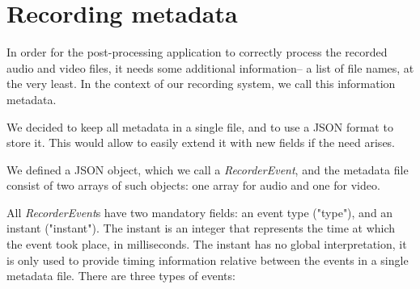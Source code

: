 \documentclass[twoside,openright,a4paper,12pt,english]{article}
\begin{document}
\section{Recording metadata}
\label{recording-metadata}
In order for the post-processing application to correctly process the recorded
audio and video files, it needs some additional information-- a list of file
names, at the very least. In the context of our recording system, we call this information
metadata.

We decided to keep all metadata in a single file, and to use a JSON
format to store it. This would allow to easily extend it with new fields if
the need arises.

We defined a JSON object, which we call a \emph{RecorderEvent}, and the
metadata file consist of two arrays of such objects: one array for audio and
one for video.

All \emph{RecorderEvent}s have two mandatory fields: an event type ("type"), and an
instant ("instant"). The instant is an integer that represents the time at which the event
took place, in milliseconds. The instant has no global interpretation, it is only
used to provide timing information relative between the events in a single
metadata file. There are three types of events:
\end{document}
